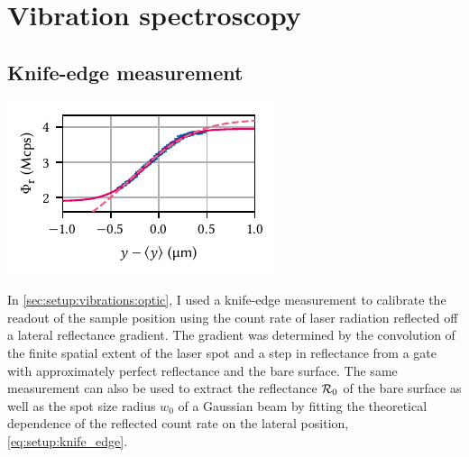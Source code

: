 \chapter{Vibration spectroscopy}\label{ch:app:setup:vibrations}
\section{Knife-edge measurement}\label{sec:app:setup:vibrations:knife_edge}
\begin{marginfigure}
    \centering
    \includegraphics{img/pdf/setup/knife_edge_erf}
    \caption{}
    \label{fig:app:setup:vibrations:knife_edge}
\end{marginfigure}

In \cref{sec:setup:vibrations:optic}, I used a knife-edge measurement to calibrate the readout of the sample position using the count rate of laser radiation reflected off a lateral reflectance gradient.
The gradient was determined by the convolution of the finite spatial extent of the laser spot and a step in reflectance from a  gate with approximately perfect reflectance and the bare  surface.
The same measurement can also be used to extract the reflectance $\mathcal{R}_{0}$ of the bare  surface as well as the spot size radius $w_0$ of a Gaussian beam by fitting the theoretical dependence of the reflected count rate on the lateral position, \cref{eq:setup:knife_edge}.

